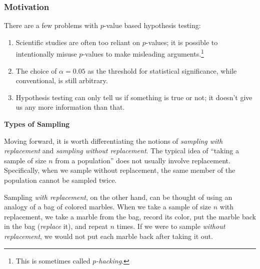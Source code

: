 \documentclass[10pt]{article}
\newenvironment{aside}{\begin{tcolorbox}[colframe=white,colback=_grey2,arc=0pt,outer arc=0pt,breakable]}{\end{tcolorbox}}
\newcommand{\spacer}[0]{\par\vspace{0.1in}}
\begin{document}
\subsubsection{Motivation}
There are a few problems with $p$-value based hypothesis testing:
\begin{enumerate}
    \item Scientific studies are often too reliant on $p$-values; it is possible to intentionally misuse $p$-values to make misleading arguments.\footnote{This is sometimes called \textit{$p$-hacking}.}
    \item The choice of $\alpha=0.05$ as the threshold for statistical significance, while conventional, is still arbitrary.
    \item Hypothesis testing can only tell us if something is true or not; it doesn't give us any more information than that.
\end{enumerate}
\begin{aside}
    \textbf{Types of Sampling}
    \spacer
    Moving forward, it is worth differentiating the notions of \textit{sampling with replacement} and \textit{sampling without replacement}. The typical idea of ``taking a sample of size $n$ from a population'' does not usually involve replacement. Specifically, when we sample without replacement, the same member of the population cannot be sampled twice.
\spacer
Sampling \textit{with replacement}, on the other hand, can be thought of using an analogy of a bag of colored marbles. When we take a sample of size $n$ with replacement, we take a marble from the bag, record its color, put the marble back in the bag (\textit{replace} it), and repeat $n$ times. If we were to sample \textit{without replacement}, we would not put each marble back after taking it out.
\end{aside}
\end{document}
